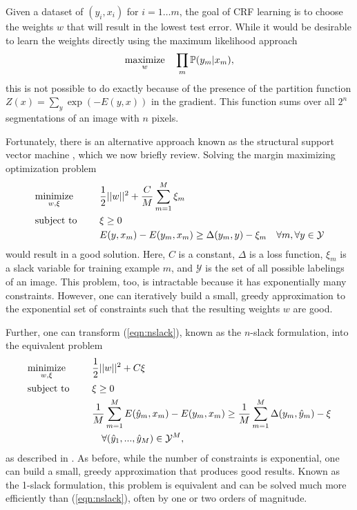\documentclass[graybox]{svmult}
\begin{document}
Given a dataset of $(y_i, x_i)$ for $i=1 \dots m$, the goal of CRF learning is to choose the weights $w$ that will result in the lowest test error. While it would be desirable to learn the weights directly using the maximum likelihood approach
\begin{align}
  \underset{w}{\mbox{maximize}}\quad \prod_m \mathbb{P}(y_m | x_m),
\end{align}
this is not possible to do exactly because of the presence of the partition function $Z(x) = \sum_{y} \exp(-E(y, x))$ in the gradient.  This function sums over all $2^n$ segmentations of an image with $n$ pixels.
  
Fortunately, there is an alternative approach known as the structural support vector machine \cite{taskar2005a, tsochantaridis2005a, szummer2008a}, which we now briefly review.  Solving the margin maximizing optimization problem
\begin{equation}
  \begin{aligned}
    & \minimize{w, \xi} & & \frac{1}{2} ||w||^2 + \frac{C}{M} \sum_{m=1}^M \xi_m \label{eqn:nslack} \\
    & \st & & \xi \geq 0 \\
& & & E ( y, x_m ) - E ( y_m, x_m ) \geq \Delta (y_m, y) - \xi_m \quad \forall m, \forall y \in \mathcal{Y}
  \end{aligned}
\end{equation}
would result in a good solution. Here, $C$ is a constant, $\Delta$ is a loss function, $\xi_m$ is a slack variable for training example $m$, and $\mathcal{Y}$ is the set of all possible labelings of an image. This problem, too, is intractable because it has exponentially many constraints.  However, one can iteratively build a small, greedy approximation to the exponential set of constraints such that the resulting weights $w$ are good.

Further, one can transform (\ref{eqn:nslack}), known as the $n$-slack formulation, into the equivalent problem
\begin{equation}
  \begin{aligned}
    & \underset{w, \xi}{\mbox{minimize}}\quad & & \frac{1}{2} ||w||^2 + C\xi \\
    & \mbox{subject to }\quad & & \xi \geq 0 \\
    & & & \frac{1}{M} \sum_{m=1}^M E ( \hat{y}_m, x_m )
    - E ( y_m, x_m ) \geq \frac{1}{M} \sum_{m=1}^M \Delta(y_m, \hat{y}_m) - \xi \\
    & & & \quad \forall (\hat{y}_1, ..., \hat{y}_M) \in \mathcal{Y}^M,
  \end{aligned}
\end{equation}
as described in \cite{joachims2009a}.  As before, while the number of constraints is exponential, one can build a small, greedy approximation that produces good results.  Known as the 1-slack formulation, this problem is equivalent and can be solved much more efficiently than (\ref{eqn:nslack}), often by one or two orders of magnitude.
\end{document}
